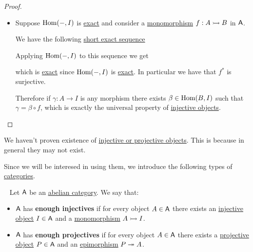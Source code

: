 \documentclass[../../../main]{subfiles}
\begin{document}
\begin{proof}
\begin{itemize}
    \item[\(\impliedby\)] Suppose \(\operatorname{Hom}(-, I)\) is \hyperref[def:exact-complex-functor]{exact} and consider a \hyperref[def:mono-epi-morphism]{monomorphism} \(f: A \rightarrowtail B\) in \(\mathsf{A}\).

          We have the following \hyperref[def:short-exact-sequence]{short exact sequence}
          \begin{center}
          \end{center}
          Applying \(\operatorname{Hom}(-, I)\) to this sequence we get
           \begin{center}
          \end{center}
          which is \hyperref[def:short-exact-sequence]{exact} since \(\operatorname{Hom}(-, I)\) is \hyperref[def:exact-complex-functor]{exact}.
          In particular we have that \(f^{\ast}\) is surjective.

          Therefore if \(\gamma: A \to I\) is any morphism there exists \(\beta \in \operatorname{Hom}(B, I)\) such that \(\gamma = \beta \circ f\), which is exactly the universal property of \hyperref[def:injective-projective-object]{injective objects}.
  \end{itemize}
\end{proof}

We haven't proven existence of \hyperref[def:injective-projective-object]{injective or projective objects}.
This is because in general they may not exist.

Since we will be interesed in using them, we introduce the following types of \hyperref[def:category]{categories}.
\begin{definition} \label{def:enough-injectives-projectives}~
  Let \(\mathsf{A}\) be an \hyperref[def:abelian-category]{abelian category}. We say that:
  \begin{itemize}
    \item \(\mathsf{A}\) has \textbf{enough injectives} if for every object \(A \in \mathsf{A}\) there exists an \hyperref[def:injective-projective-object]{injective object} \(I \in \mathsf{A}\) and a \hyperref[def:mono-epi-morphism]{monomorphism} \(A \rightarrowtail I\).
    \item \(\mathsf{A}\) has \textbf{enough projectives} if for every object \(A \in \mathsf{A}\) there exists a \hyperref[def:injective-projective-object]{projective object} \(P \in \mathsf{A}\) and an \hyperref[def:mono-epi-morphism]{epimorphism} \(P \twoheadrightarrow A\).
  \end{itemize}
\end{definition}
\end{document}
